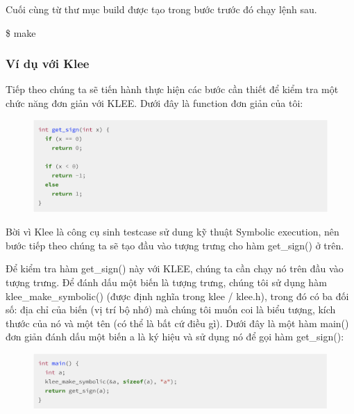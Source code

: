 \documentclass[12pt,a4paper]{article}
\begin{document}
Cuối cùng từ thư mục build được tạo trong bước trước đó chạy lệnh sau.

\begin{framed}
\$ make
\end{framed}

\subsubsection{Ví dụ với Klee}

Tiếp theo chúng ta sẽ tiến hành thực hiện các bước cần thiết để kiểm tra một chức năng đơn giản với KLEE. Dưới đây là function đơn giản của tôi:

\begin{figure}[ht]
\begin{center}
\includegraphics[scale=.3]{hinhanh/functionexample.png}
\end{center}
\end{figure}

Bời vì Klee là công cụ sinh testcase sử dung kỹ thuật Symbolic execution, nên bước tiếp theo chúng ta sẽ tạo đầu vào tượng trưng cho hàm get\_sign() ở trên.

Để kiểm tra hàm get\_sign() này với KLEE, chúng ta cần chạy nó trên đầu vào tượng trưng. Để đánh dấu một biến là tượng trưng, chúng tôi sử dụng hàm klee\_make\_symbolic() (được định nghĩa trong klee / klee.h), trong đó có ba đối số: địa chỉ của biến (vị trí bộ nhớ) mà chúng tôi muốn coi là biểu tượng, kích thước của nó và một tên (có thể là bất cứ điều gì). Dưới đây là một hàm main() đơn giản đánh dấu một biến a là ký hiệu và sử dụng nó để gọi hàm get\_sign(): \newpage

\begin{figure}[ht]
\begin{center}
\includegraphics[scale=.3]{hinhanh/mainexample.png}
\end{center}
\end{figure}
\end{document}
